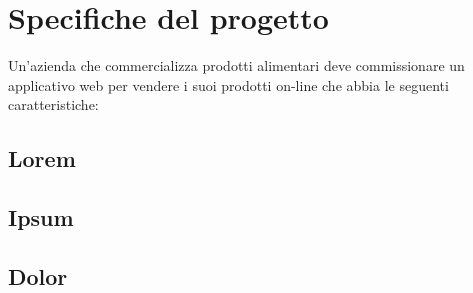 
\chapter{Specifiche del progetto}
\label{cap:specifiche-del-progetto}

Un'azienda che commercializza prodotti alimentari deve commissionare un applicativo web per vendere i suoi prodotti on-line che abbia le seguenti caratteristiche:

\section{Lorem}
\lipsum[2]

\section{Ipsum}
\lipsum[3]

\section{Dolor}
\lipsum[4-5]